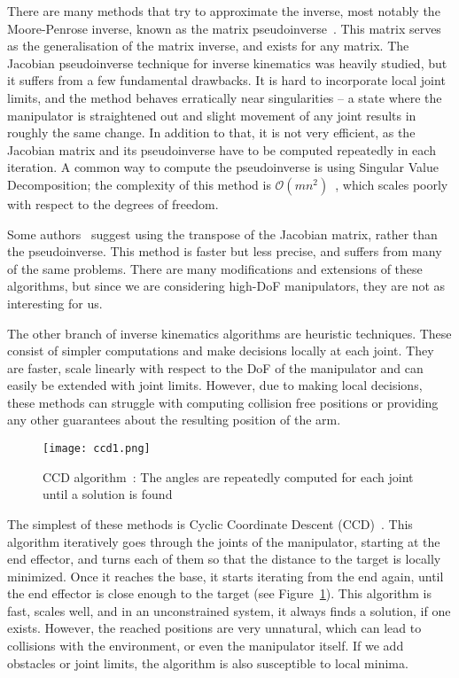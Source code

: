 There are many methods that try to approximate the inverse, most notably the Moore-Penrose inverse, known as the matrix pseudoinverse~\cite{penrose_1955}. This matrix serves as the generalisation of the matrix inverse, and exists for any matrix. The Jacobian pseudoinverse technique for inverse kinematics was heavily studied, but it suffers from a few fundamental drawbacks. It is hard to incorporate local joint limits, and the method behaves erratically near singularities -- a state where the manipulator is straightened out and slight movement of any joint results in roughly the same change.
In addition to that, it is not very efficient, as the Jacobian matrix and its pseudoinverse have to be computed repeatedly in each iteration. A common way to compute the pseudoinverse is using Singular Value Decomposition; the complexity of this method is $\mathcal{O}(mn^2)$~\cite{trefethen1997numerical}, which scales poorly with respect to the degrees of freedom.

Some authors~\cite{Wolovich1984ACT} suggest using the transpose of the Jacobian matrix, rather than the pseudoinverse. This method is faster but less precise, and suffers from many of the same problems. There are many modifications and extensions of these algorithms, but since we are considering high-DoF manipulators, they are not as interesting for us.

The other branch of inverse kinematics algorithms are heuristic techniques. These consist of simpler computations and make decisions locally at each joint. They are faster, scale linearly with respect to the DoF of the manipulator and can easily be extended with joint limits. However, due to making local decisions, these methods can struggle with computing collision free positions or providing any other guarantees about the resulting position of the arm.

\begin{figure}
    \centering
    \texttt{[image: ccd1.png]}
    \caption{CCD algorithm~\cite{Ondika2021thesis}: The angles are repeatedly computed for each joint until a solution is found}
    \label{fig:ccd}
\end{figure}

The simplest of these methods is Cyclic Coordinate Descent (CCD)~\cite{ccd}. This algorithm iteratively goes through the joints of the manipulator, starting at the end effector, and turns each of them so that the distance to the target is locally minimized. Once it reaches the base, it starts iterating from the end again, until the end effector is close enough to the target (see Figure~\ref{fig:ccd}). This algorithm is fast, scales well, and in an unconstrained system, it always finds a solution, if one exists. However, the reached positions are very unnatural, which can lead to collisions with the environment, or even the manipulator itself. If we add obstacles or joint limits, the algorithm is also susceptible to local minima.

